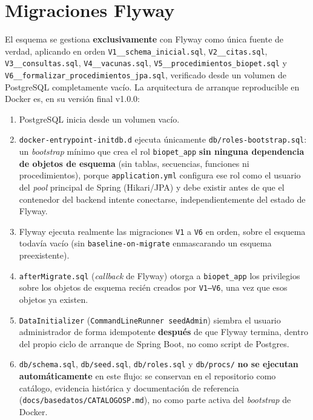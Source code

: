 \section{Migraciones Flyway}
\label{sec:migraciones-flyway}

El esquema se gestiona \textbf{exclusivamente} con Flyway como \'unica
fuente de verdad, aplicando en orden \texttt{V1\_\_schema\_inicial.sql},
\texttt{V2\_\_citas.sql}, \texttt{V3\_\_consultas.sql},
\texttt{V4\_\_vacunas.sql}, \texttt{V5\_\_procedimientos\_biopet.sql} y
\texttt{V6\_\_formalizar\_procedimientos\_jpa.sql}, verificado desde un
volumen de PostgreSQL completamente vac\'io. La arquitectura de arranque
reproducible en Docker es, en su versi\'on final v1.0.0:

\begin{enumerate}[nosep]
  \item PostgreSQL inicia desde un volumen vac\'io.
  \item \texttt{docker-entrypoint-initdb.d} ejecuta \'unicamente
    \texttt{db/roles-bootstrap.sql}: un \emph{bootstrap} m\'inimo que crea
    el rol \texttt{biopet\_app} \textbf{sin ninguna dependencia de objetos
    de esquema} (sin tablas, secuencias, funciones ni procedimientos),
    porque \texttt{application.yml} configura ese rol como el usuario del
    \emph{pool} principal de Spring (Hikari/JPA) y debe existir antes de
    que el contenedor del backend intente conectarse, independientemente
    del estado de Flyway.
  \item Flyway ejecuta realmente las migraciones \texttt{V1} a \texttt{V6}
    en orden, sobre el esquema todav\'ia vac\'io (sin
    \texttt{baseline-on-migrate} enmascarando un esquema preexistente).
  \item \texttt{afterMigrate.sql} (\emph{callback} de Flyway) otorga a
    \texttt{biopet\_app} los privilegios sobre los objetos de esquema
    reci\'en creados por \texttt{V1--V6}, una vez que esos objetos ya
    existen.
  \item \texttt{DataInitializer} (\texttt{CommandLineRunner
    seedAdmin}) siembra el usuario administrador de forma idempotente
    \textbf{despu\'es} de que Flyway termina, dentro del propio ciclo de
    arranque de Spring Boot, no como script de Postgres.
  \item \texttt{db/schema.sql}, \texttt{db/seed.sql}, \texttt{db/roles.sql}
    y \texttt{db/procs/} \textbf{no se ejecutan autom\'aticamente} en este
    flujo: se conservan en el repositorio como cat\'alogo, evidencia
    hist\'orica y documentaci\'on de referencia (\texttt{docs/basedatos/CATALOGOSP.md}),
    no como parte activa del \emph{bootstrap} de Docker.
\end{enumerate}


